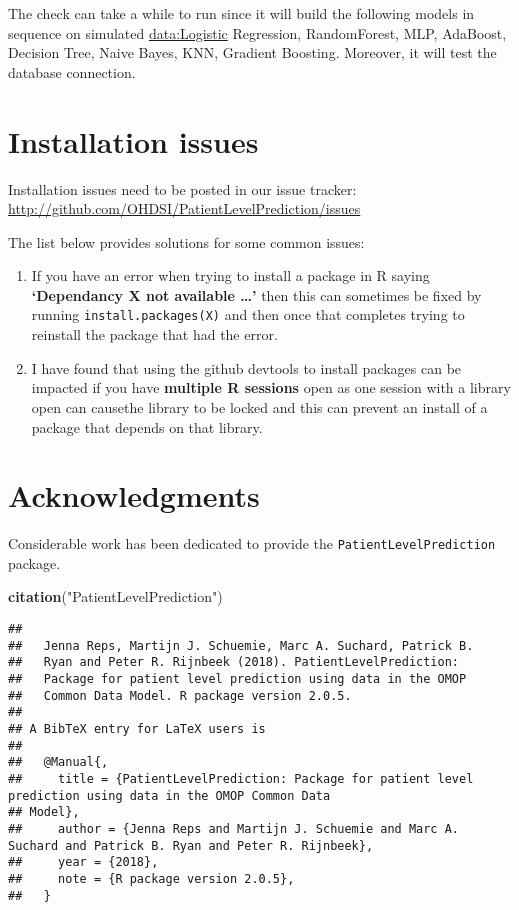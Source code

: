 \documentclass[]{article}
\newenvironment{Shaded}{\begin{snugshade}}{\end{snugshade}}
\newcommand{\KeywordTok}[1]{\textcolor[rgb]{0.13,0.29,0.53}{\textbf{#1}}}
\newcommand{\StringTok}[1]{\textcolor[rgb]{0.31,0.60,0.02}{#1}}
\newcommand{\NormalTok}[1]{#1}
\begin{document}
The check can take a while to run since it will build the following
models in sequence on simulated \url{data:Logistic} Regression,
RandomForest, MLP, AdaBoost, Decision Tree, Naive Bayes, KNN, Gradient
Boosting. Moreover, it will test the database connection.

\section{Installation issues}\label{installation-issues}

Installation issues need to be posted in our issue tracker:
\url{http://github.com/OHDSI/PatientLevelPrediction/issues}

The list below provides solutions for some common issues:

\begin{enumerate}
\def\labelenumi{\arabic{enumi}.}
\item
  If you have an error when trying to install a package in R saying
  \textbf{`Dependancy X not available \ldots{}'} then this can sometimes
  be fixed by running
  \texttt{install.packages(\textquotesingle{}X\textquotesingle{})} and
  then once that completes trying to reinstall the package that had the
  error.
\item
  I have found that using the github devtools to install packages can be
  impacted if you have \textbf{multiple R sessions} open as one session
  with a library open can causethe library to be locked and this can
  prevent an install of a package that depends on that library.
\end{enumerate}

\section{Acknowledgments}\label{acknowledgments}

Considerable work has been dedicated to provide the
\texttt{PatientLevelPrediction} package.

\begin{Shaded}
\begin{Highlighting}[]
\KeywordTok{citation}\NormalTok{(}\StringTok{"PatientLevelPrediction"}\NormalTok{)}
\end{Highlighting}
\end{Shaded}

\begin{verbatim}
## 
##   Jenna Reps, Martijn J. Schuemie, Marc A. Suchard, Patrick B.
##   Ryan and Peter R. Rijnbeek (2018). PatientLevelPrediction:
##   Package for patient level prediction using data in the OMOP
##   Common Data Model. R package version 2.0.5.
## 
## A BibTeX entry for LaTeX users is
## 
##   @Manual{,
##     title = {PatientLevelPrediction: Package for patient level prediction using data in the OMOP Common Data
## Model},
##     author = {Jenna Reps and Martijn J. Schuemie and Marc A. Suchard and Patrick B. Ryan and Peter R. Rijnbeek},
##     year = {2018},
##     note = {R package version 2.0.5},
##   }
\end{verbatim}
\end{document}
